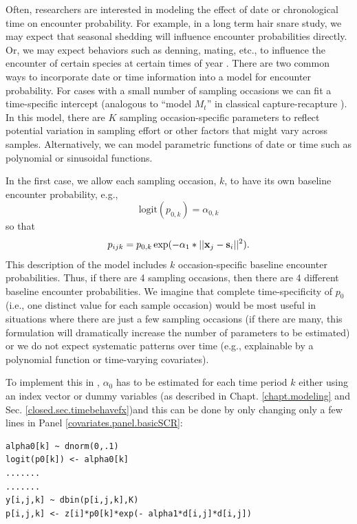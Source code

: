 Often, researchers are interested in modeling the effect of date or
chronological time on encounter probability. For example, in a long
term hair snare study, we may expect that seasonal shedding
\citep{wegan_etal:2012} will influence encounter probabilities
directly. Or, we may expect behaviors such as denning, mating, etc.,
to influence the encounter of certain species at certain times of year
\citep{kery_etal:2011}.  There are two common ways to incorporate date
or time information into a model for encounter probability. For cases
with a small number of sampling occasions we can fit a time-specific
intercept (analogous to ``model $M_{t}$'' in classical
capture-recapture \citep{otis_etal:1978}). In this model, there are
$K$ sampling occasion-specific parameters to reflect potential
variation in sampling effort or other factors that might vary across
samples.  Alternatively, we can model parametric functions of date or
time such as polynomial or sinusoidal functions.

In the first case, we allow each sampling occasion, $k$, to have its
own baseline encounter probability, e.g.,
\[
\mbox{logit}(p_{0,k}) = \alpha_{0,k}
\]
so that
\[
p_{ijk} = p_{0,k} \exp(- \alpha_1*||{\bf x}_{j}-{\bf s}_{i}||^2).
\]
This description of the model includes $k$ occasion-specific baseline
encounter probabilities.  Thus, if there are 4 sampling occasions, then
there are 4 different baseline encounter probabilities.  We imagine
that complete time-specificity of $p_{0}$ 
(i.e., one distinct value for each sample occasion)
would be most useful in situations
where there are just a few sampling occasions (if there are many, this
formulation will dramatically increase the number of parameters to be
estimated) or we do not expect systematic patterns over time (e.g.,
explainable by a polynomial function or time-varying covariates).

To implement this in \jags, $\alpha_0$ has to be
estimated for each time period $k$ either using an index vector or
dummy variables (as described in Chapt. \ref{chapt.modeling} and Sec. 
\ref{closed.sec.timebehavefx})and this can be done by only 
changing only a few lines in Panel \ref{covariates.panel.basicSCR}:
\begin{verbatim}
alpha0[k] ~ dnorm(0,.1)
logit(p0[k]) <- alpha0[k]
.......
.......
y[i,j,k] ~ dbin(p[i,j,k],K)
p[i,j,k] <- z[i]*p0[k]*exp(- alpha1*d[i,j]*d[i,j])
\end{verbatim}

